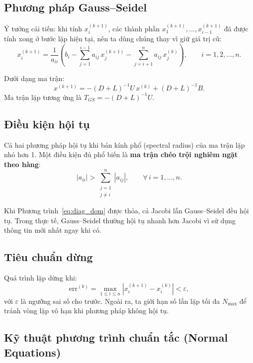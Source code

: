 \documentclass[12pt,a4paper]{article}
\begin{document}
\subsection{Phương pháp Gauss--Seidel}

Ý tưởng cải tiến: khi tính $x_i^{(k+1)}$, các thành phần $x_1^{(k+1)}, \dots, x_{i-1}^{(k+1)}$ đã được tính xong ở bước lặp hiện tại, nên ta dùng chúng thay vì giữ giá trị cũ:
\begin{equation}
    x_i^{(k+1)} = \frac{1}{a_{ii}}\left(b_i - \sum_{j=1}^{i-1} a_{ij}\,x_j^{(k+1)} - \sum_{j=i+1}^{n} a_{ij}\,x_j^{(k)}\right),
    \qquad i=1,2,\dots,n.
    \label{eq:gauss_seidel}
\end{equation}

Dưới dạng ma trận:
\[
    x^{(k+1)} = -(D+L)^{-1}U\,x^{(k)} + (D+L)^{-1}B.
\]
Ma trận lặp tương ứng là $T_{GS} = -(D+L)^{-1}U$.

\subsection{Điều kiện hội tụ}

Cả hai phương pháp hội tụ khi bán kính phổ (spectral radius) của ma trận lặp nhỏ hơn 1. Một điều kiện đủ phổ biến là \textbf{ma trận chéo trội nghiêm ngặt theo hàng}:
\begin{equation}
    |a_{ii}| > \sum_{\substack{j=1\\j\neq i}}^{n} |a_{ij}|, \qquad \forall\, i=1,\dots,n.
    \label{eq:diag_dom}
\end{equation}

Khi Phương trình~\eqref{eq:diag_dom} được thỏa, cả Jacobi lẫn Gauss--Seidel đều hội tụ. Trong thực tế, Gauss--Seidel thường hội tụ nhanh hơn Jacobi vì sử dụng thông tin mới nhất ngay khi có.

\subsection{Tiêu chuẩn dừng}

Quá trình lặp dừng khi:
\begin{equation}
    \mathrm{err}^{(k)} = \max_{1\le i\le n}\left|x_i^{(k+1)}-x_i^{(k)}\right| < \varepsilon,
    \label{eq:stop}
\end{equation}
với $\varepsilon$ là ngưỡng sai số cho trước. Ngoài ra, ta giới hạn số lần lặp tối đa $N_{\max}$ để tránh vòng lặp vô hạn khi phương pháp không hội tụ.

\subsection{Kỹ thuật phương trình chuẩn tắc (Normal Equations)}
\label{sec:normal_eq}
\end{document}
